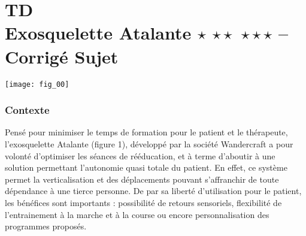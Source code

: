 \chapter*{TD  \\ 
Exosquelette Atalante  \ifnormal $\star$ \else \fi \ifdifficile $\star\star$ \else \fi \iftdifficile $\star\star\star$ \else \fi
-- \ifprof Corrigé \else Sujet \fi}

\iflivret {} \else
\ifprof  {} \else \fi
\fi

\setcounter{question}{0}
\begin{marginfigure}
\texttt{[image: fig\_00]}
\end{marginfigure}


\subsection*{Contexte}

Pensé pour minimiser le temps de formation pour le patient et le thérapeute, l’exosquelette Atalante (figure 1),
 développé par la société Wandercraft a pour volonté d’optimiser les séances de rééducation, et à terme d’aboutir  à une solution permettant l’autonomie quasi totale du patient. En effet, ce système permet la verticalisation et
 des déplacements pouvant s’affranchir de toute dépendance à une tierce personne. De par sa liberté d’utilisation
 pour le patient, les bénéfices sont importants : possibilité de retours sensoriels, flexibilité de l’entrainement à la
 marche et à la course ou encore personnalisation des programmes proposés.

